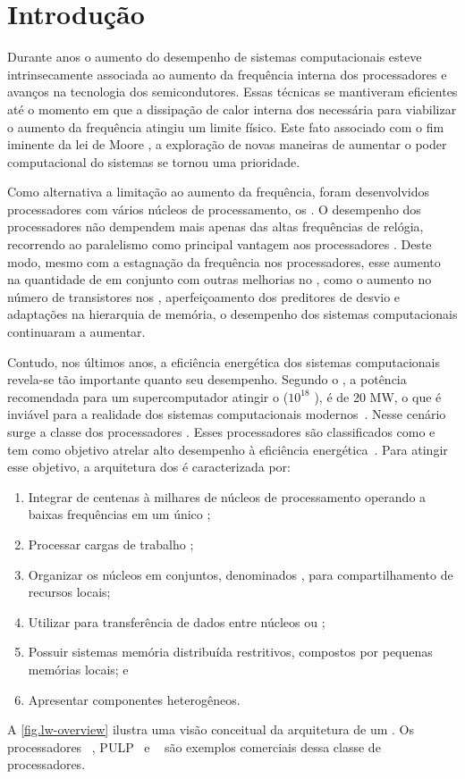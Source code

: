 \glsresetall

\chapter{Introdução}
\label{chap.intro}

Durante anos o aumento do desempenho de sistemas computacionais esteve intrinsecamente associada ao aumento da frequência interna dos processadores e avanços na tecnologia dos semicondutores. Essas técnicas se mantiveram eficientes até o momento em que a dissipação de calor interna dos \chips necessária para viabilizar o aumento da frequência atingiu um limite físico. Este fato associado com o fim iminente da lei de Moore \cite{moore:1965}, a exploração de novas maneiras de aumentar o poder computacional do sistemas se tornou uma prioridade.

Como alternativa a limitação ao aumento da frequência, foram desenvolvidos processadores com vários núcleos de processamento, os \multicores. O desempenho dos processadores \multicores não dempendem mais apenas das altas frequências de relógia, recorrendo ao paralelismo como principal vantagem aos processadores \singlecore. Deste modo, mesmo com a estagnação da frequência nos processadores, esse aumento na quantidade de \cores em conjunto com outras melhorias no \hardware, como o aumento no número de transistores nos \chips, aperfeiçoamento dos preditores de desvio e adaptações na hierarquia de memória, o desempenho dos sistemas computacionais continuaram a aumentar.

Contudo, nos últimos anos, a eficiência energética dos sistemas computacionais revela-se tão importante quanto seu desempenho. Segundo o \darpa, a potência recomendada para um supercomputador atingir o \exascale ($10^{18}$ \flops), é de 20 MW, o que é inviável para a realidade dos sistemas computacionais modernos~\cite{darpa:exascale}. Nesse cenário surge a classe dos processadores \lws. Esses processadores são classificados como \mpsocs e tem como objetivo atrelar alto desempenho à eficiência energética~\cite{francesquini2015}. Para atingir esse objetivo, a arquitetura dos \lws é caracterizada por:
\begin{enumerate}[label=(\roman*)]
    \item Integrar de centenas à milhares de núcleos de processamento operando a baixas frequências em um único \chip;
    \item Processar cargas de trabalho \mimd;
    \item Organizar os núcleos em conjuntos, denominados \clusters, para compartilhamento de recursos locais;
    \item Utilizar \nocs para transferência de dados entre núcleos ou \clusters;
    \item Possuir sistemas memória distribuída restritivos, compostos por pequenas memórias locais; e
    \item Apresentar componentes heterogêneos.
\end{enumerate}
A \autoref{fig.lw-overview} ilustra uma visão conceitual da arquitetura de um \lw. Os processadores \mppa~\cite{dinechin:2013}, PULP~\cite{pulp} e \taihulight~\cite{fu2016sunway} são exemplos comerciais dessa classe de processadores.

